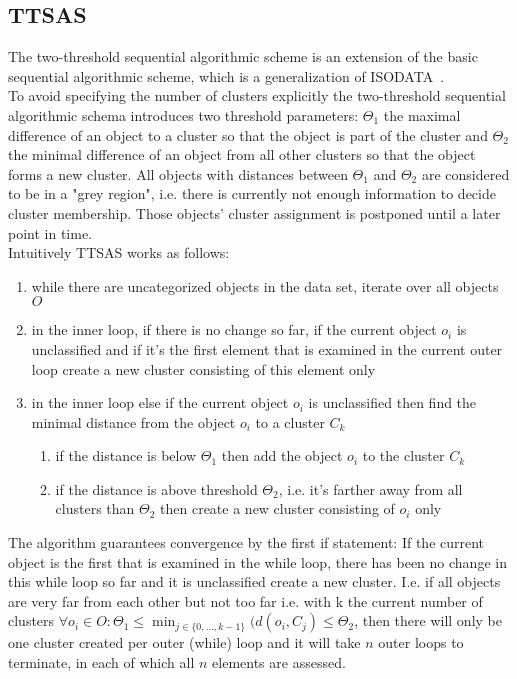 \subsection{TTSAS}\label{\positionnumber}
The two-threshold sequential algorithmic scheme is an extension of the basic sequential algorithmic scheme, which is a generalization of ISODATA~\cite{ball1967clustering, THEODORIDIS2009627}. \\
To avoid specifying the number of clusters explicitly the two-threshold sequential algorithmic schema introduces two threshold parameters: $\Theta_1$ the maximal difference of an object to a cluster so that the object is part of the cluster and $\Theta_2$ the minimal difference of an object from all other clusters so that the object forms a new cluster. All objects with distances between $\Theta_1$ and $\Theta_2$ are considered to be in a "grey region", i.e. there is currently not enough information to decide cluster membership. Those objects' cluster assignment is postponed until a later point in time. \\
Intuitively TTSAS works as follows:
\begin{enumerate}
    \item while there are uncategorized objects in the data set, iterate over all objects $O$
    \item in the inner loop, if there is no change so far, if the current object $o_i$ is unclassified and if it's the first element that is examined in the current outer loop create a new cluster consisting of this element only
    \item in the inner loop else if the current object $o_i$ is unclassified then find the minimal distance from the object $o_i$ to a cluster $C_k$
    \begin{enumerate}
        \item if the distance is below $\Theta_1$ then add the object $o_i$ to the cluster $C_k$
        \item if the distance is above threshold $\Theta_2$, i.e. it's farther away from all clusters than $\Theta_2$ then create a new cluster consisting of $o_i$ only
    \end{enumerate}
\end{enumerate}
The algorithm guarantees convergence by the first if statement: If the current object is the first that is examined in the while loop, there has been no change in this while loop so far and it is unclassified create a new cluster. I.e. if all objects are very far from each other but not too far i.e. with k the current number of clusters $\forall o_i \in O: \Theta_1 \leq \min_{j \in \{0, \dots, k-1\}}(d(o_i, C_j) \leq \Theta_2$, then there will only be one cluster created per outer (while) loop and it will take $n$ outer loops to terminate, in each of which all $n$ elements are assessed.



